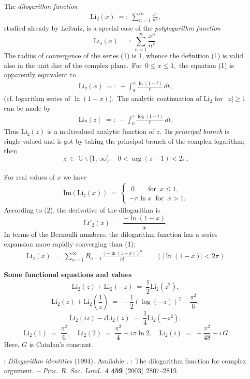 \documentclass[12pt]{article}
\theoremstyle{definition}
\begin{document}
The {\it dilogarithm function} 
\begin{align}
\mbox{Li}_2(x) \;=:\; \sum_{n=1}^{\infty}\frac{x^n}{n^2},
\end{align}
studied already by Leibniz, is a special case of the {\it polylogarithm function}
$$\mbox{Li}_s(x) \;=:\; \sum_{n=1}^{\infty}\frac{x^n}{n^s}.$$
The radius of convergence of the series (1) is 1, whence the definition (1) is valid also in the unit disc of the complex plane.\, For\, $0 \le x \le 1$,\, the equation (1) is apparently equivalent to
\begin{align}
\mbox{Li}_2(x) \;=:\; -\int_0^x\frac{\ln(1\!-\!t)}{t}\,dt,
\end{align}
(cf. logarithm series of $\ln(1\!-\!x)$).\, The analytic continuation of $\mbox{Li}_2$ for\, $|z| \ge 1$\, can be made by
\begin{align}
\mbox{Li}_2(z) \;=:\; -\int_0^z\frac{\log(1\!-\!t)}{t}\,dt.
\end{align}
Thus $\mbox{Li}_2(z)$ is a multivalued analytic function of $z$.\, Its {\it principal branch} is single-valued and is got by taking the principal branch of the complex logarithm; then
$$z \;\in\; \mathbb{C}\!\smallsetminus\![1,\,\infty[, \quad 0 < \arg(z\!-\!1) < 2\pi.$$\\

For real values of $x$ we have
\begin{align*}
\mbox{Im}(\mbox{Li}_2(x)) \;=\;
\begin{cases}
\;0 \qquad\mbox{for}\;\; x \le 1,\\
-\pi\ln{x} \;\;\mbox{for}\;\; x > 1.
\end{cases}
\end{align*}
According to (2), the derivative of the dilogarithm is
$$\mbox{Li}'_2(x) \;=\; \frac{-\ln(1\!-\!x)}{x}.$$
In terms of the Bernoulli numbers, the dilogarithm function has a series expansion more rapidly converging than (1):
\begin{align}
\mbox{Li}_2(x) \;=\; \sum_{n=1}^{\infty}B_{n-1}\frac{(-\ln(1\!-\!x))^n}{n!} 
\qquad (|\ln(1\!-\!x)| < 2\pi)
\end{align}


\textbf{Some functional equations and values}
$$\mbox{Li}_2(z)+\mbox{Li}_2(-z) \;=\; \frac{1}{2}\mbox{Li}_2(z^2),$$
$$\mbox{Li}_2(z)+\mbox{Li}_2\left(\frac{1}{z}\right) \;=\; -\frac{1}{2}(\log(-z))^2-\frac{\pi^2}{6},$$
$$\mbox{Li}_2(iz)-i\mbox{Li}_2(z) \;=\; \frac{1}{4}\mbox{Li}_2(-z^2),$$
$$\mbox{Li}_2(1) \;=\; \frac{\pi^2}{6}, \quad
\mbox{Li}_2(2) \;=\; \frac{\pi^2}{4}-i\pi\ln{2}, \quad
\mbox{Li}_2(i) \;=\; -\frac{\pi^2}{48}-i\,G$$
Here, $G$ is Catalan's constant.\\

\begin{thebibliography}{8}
: {\it Dilogarithm identities} (1994). Available .
:  The dilogarithm function for complex argument.\, -- {\it Proc. R. Soc. Lond. A} \textbf{459} (2003) 2807--2819.

\end{thebibliography}

\end{document}

